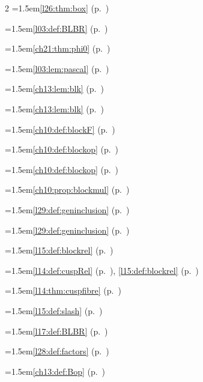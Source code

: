 \begin{multicols}{2}
\hangindent=1.5em\quad \ref{l26:thm:box} (p.~\pageref{l26:thm:box})\par
\hangindent=1.5em\quad \ref{l03:def:BLBR} (p.~\pageref{l03:def:BLBR})\par
\hangindent=1.5em\quad \ref{ch21:thm:phi0} (p.~\pageref{ch21:thm:phi0})\par
\hangindent=1.5em\quad \ref{l03:lem:pascal} (p.~\pageref{l03:lem:pascal})\par
\hangindent=1.5em\quad \ref{ch13:lem:blk} (p.~\pageref{ch13:lem:blk})\par
\hangindent=1.5em\quad \ref{ch13:lem:blk} (p.~\pageref{ch13:lem:blk})\par
\hangindent=1.5em\quad \ref{ch10:def:blockF} (p.~\pageref{ch10:def:blockF})\par
\hangindent=1.5em\quad \ref{ch10:def:blockop} (p.~\pageref{ch10:def:blockop})\par
\hangindent=1.5em\quad \ref{ch10:def:blockop} (p.~\pageref{ch10:def:blockop})\par
\hangindent=1.5em\quad \ref{ch10:prop:blockmul} (p.~\pageref{ch10:prop:blockmul})\par
\hangindent=1.5em\quad \ref{l29:def:geninclusion} (p.~\pageref{l29:def:geninclusion})\par
\hangindent=1.5em\quad \ref{l29:def:geninclusion} (p.~\pageref{l29:def:geninclusion})\par
\hangindent=1.5em\quad \ref{l15:def:blockrel} (p.~\pageref{l15:def:blockrel})\par
\hangindent=1.5em\quad \ref{l14:def:cuspRel} (p.~\pageref{l14:def:cuspRel}), \ref{l15:def:blockrel} (p.~\pageref{l15:def:blockrel})\par
\hangindent=1.5em\quad \ref{l14:thm:cuspfibre} (p.~\pageref{l14:thm:cuspfibre})\par
\hangindent=1.5em\quad \ref{l15:def:slash} (p.~\pageref{l15:def:slash})\par
\hangindent=1.5em\quad \ref{l17:def:BLBR} (p.~\pageref{l17:def:BLBR})\par
\hangindent=1.5em\quad \ref{l28:def:factors} (p.~\pageref{l28:def:factors})\par
\hangindent=1.5em\quad \ref{ch13:def:Bop} (p.~\pageref{ch13:def:Bop})\par

\end{multicols}
